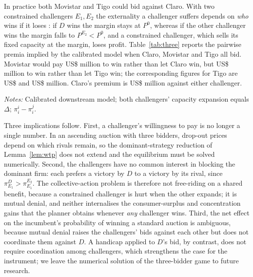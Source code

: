 \documentclass[12pt,a4paper]{article}
\theoremstyle{definition}
\theoremstyle{remark}
\newcommand{\us}{US\$}
\begin{document}
In practice both Movistar and Tigo could bid against Claro. With two constrained challengers $E_1,E_2$ the externality a challenger suffers depends on \emph{who} wins if it loses \citep{jehielmoldovanu2000}: if $D$ wins the margin stays at $P^0$, whereas if the other challenger wins the margin falls to $P^{E_2}<P^0$, and a constrained challenger, which sells its fixed capacity at the margin, loses profit. Table~\ref{tab:three} reports the pairwise premia implied by the calibrated model when Claro, Movistar and Tigo all bid. Movistar would pay \us\pairMvsC{} million to win rather than let Claro win, but \us\pairMvsT{} million to win rather than let Tigo win; the corresponding figures for Tigo are \us\pairTvsC{} and \us\pairTvsM{} million. Claro's premium is \us\pairCvsE{} million against either challenger.

\begin{table}[!htbp]
\centering\small
\caption{Pairwise premia with three bidders (US\$ million, present value): bidder $i$'s gain from winning rather than losing to the winner in each column}\label{tab:three}

\par\vspace{2pt}\footnotesize\textit{Notes:} Calibrated downstream model; both challengers' capacity expansion equals $\Delta$; $\pi_i^i-\pi_i^j$.
\end{table}

Three implications follow. First, a challenger's willingness to pay is no longer a single number. In an ascending auction with three bidders, drop-out prices depend on which rivals remain, so the dominant-strategy reduction of Lemma~\ref{lem:wtp} does not extend and the equilibrium must be solved numerically. Second, the challengers have no common interest in blocking the dominant firm: each prefers a victory by $D$ to a victory by its rival, since $\pi_{E_1}^{D}>\pi_{E_1}^{E_2}$. The collective-action problem is therefore not free-riding on a shared benefit, because a constrained challenger is hurt when the other expands; it is mutual denial, and neither internalises the consumer-surplus and concentration gains that the planner obtains whenever \emph{any} challenger wins. Third, the net effect on the incumbent's probability of winning a standard auction is ambiguous, because mutual denial raises the challengers' bids against each other but does not coordinate them against $D$. A handicap applied to $D$'s bid, by contrast, does not require coordination among challengers, which strengthens the case for the instrument; we leave the numerical solution of the three-bidder game to future research.
\end{document}
